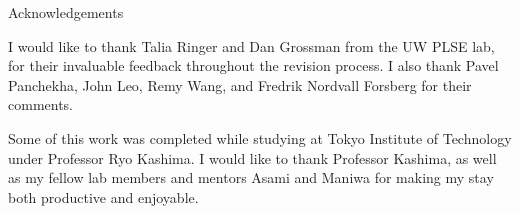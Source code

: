 \documentclass[runningheads]{llncs}
\def\Forsberg/{Nordvall Forsberg}
\begin{document}
\begin{subsubsection}{Acknowledgements}

I would like to thank Talia Ringer and Dan Grossman from the UW PLSE lab, for their invaluable feedback throughout the revision process. I also thank Pavel Panchekha, John Leo, Remy Wang, and Fredrik \Forsberg/ for their comments.

Some of this work was completed while studying at Tokyo Institute of Technology under Professor Ryo Kashima. I would like to thank Professor Kashima, as well as my fellow lab members and mentors Asami and Maniwa for making my stay both productive and enjoyable.

\end{subsubsection}



\end{document}
